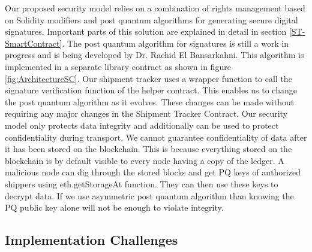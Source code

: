 Our proposed security model relies on a combination of rights management based on Solidity modifiers and post quantum algorithms for generating secure digital signatures. Important parts of this solution are explained in detail in section \ref{ST-SmartContract}. The post quantum algorithm for signatures is still a work in progress and is being developed by Dr. Rachid El Bansarkahni. This algorithm is implemented in a separate library contract as shown in figure \ref{fig:ArchitectureSC}. Our shipment tracker uses a wrapper function to call the signature verification function of the helper contract. This enables us to change the post quantum algorithm as it evolves. These changes can be made without requiring any major changes in the Shipment Tracker Contract. Our security model only protects data integrity and additionally can be used to protect confidentiality during transport. We cannot guarantee confidentiality of data after it has been stored on the blockchain.  This is because everything stored on the blockchain is by default visible to every node having a copy of the ledger. A malicious node can dig through the stored blocks and get PQ keys of authorized shippers using eth.getStorageAt function. They can then use these keys to decrypt data. If we use asymmetric post quantum algorithm than knowing the PQ public key alone will not be enough to violate integrity. 


\subsection{Implementation Challenges}
